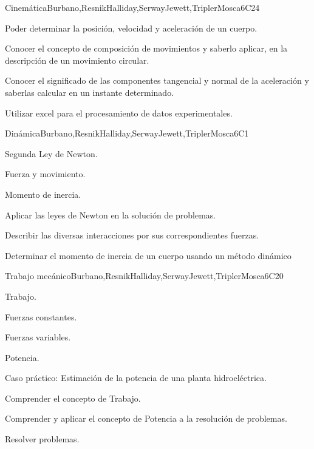 \begin{syllabus}
\begin{unit}{}{Cinemática}{Burbano,ResnikHalliday,SerwayJewett,TriplerMosca}{6}{C24}
   \begin{learningoutcomes}
      \item Poder determinar la posición, velocidad y aceleración de un cuerpo.
      \item Conocer el concepto de composición de movimientos y saberlo aplicar, en la descripción de un movimiento circular.
      \item Conocer el significado de las componentes tangencial y normal de la aceleración y saberlas calcular en un instante determinado. 
      \item Utilizar excel para el procesamiento de datos experimentales.
   \end{learningoutcomes}
\end{unit}

\begin{unit}{}{Dinámica}{Burbano,ResnikHalliday,SerwayJewett,TriplerMosca}{6}{C1}
\begin{topics}
      \item Segunda Ley de Newton.
      \item Fuerza y movimiento.
      \item Momento de inercia.
   \end{topics}

   \begin{learningoutcomes}
      \item Aplicar las leyes de Newton en la solución de problemas.
      \item Describir las diversas interacciones por sus correspondientes fuerzas.
      \item Determinar el momento de inercia de un cuerpo usando un método dinámico
   \end{learningoutcomes}
\end{unit}

\begin{unit}{}{Trabajo mecánico}{Burbano,ResnikHalliday,SerwayJewett,TriplerMosca}{6}{C20}
\begin{topics}
      \item Trabajo.
      \item Fuerzas constantes.
      \item Fuerzas variables.
      \item Potencia.
      \item Caso práctico: Estimación de la potencia de una planta hidroeléctrica.
  \end{topics}

   \begin{learningoutcomes}
      \item Comprender el concepto de Trabajo.
      \item Comprender y aplicar el concepto de Potencia a la resolución de problemas.
      \item Resolver problemas.
   \end{learningoutcomes}
\end{unit}


\end{syllabus}

